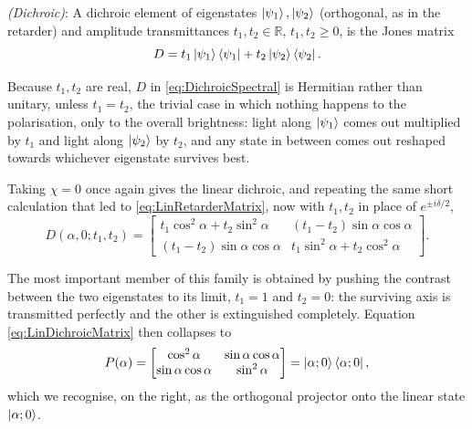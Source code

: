             \begin{myDef}
                \textit{(Dichroic)}: A dichroic element of eigenstates $\ket{\psi_1},\ket{\psi_2}$ (orthogonal, as in the retarder) and amplitude transmittances $t_1,t_2\in\mathbb{R}$, $t_1,t_2\geq0$, is the Jones matrix
                \begin{equation}\label{eq:DichroicSpectral}
                    D = t_1\ket{\psi_1}\bra{\psi_1} + t_2\ket{\psi_2}\bra{\psi_2}.
                \end{equation}
            \end{myDef}

            Because $t_1,t_2$ are real, $D$ in \ref{eq:DichroicSpectral} is Hermitian rather than unitary, unless $t_1=t_2$, the trivial case in which nothing happens to the polarisation, only to the overall brightness: light along $\ket{\psi_1}$ comes out multiplied by $t_1$ and light along $\ket{\psi_2}$ by $t_2$, and any state in between comes out reshaped towards whichever eigenstate survives best.

            Taking $\chi=0$ once again gives the linear dichroic, and repeating the same short calculation that led to \ref{eq:LinRetarderMatrix}, now with $t_1,t_2$ in place of $e^{\pm i\delta/2}$,
            \begin{equation}\label{eq:LinDichroicMatrix}
                D(\alpha,0;t_1,t_2) = \begin{bmatrix}
                    t_1\cos^2\alpha + t_2\sin^2\alpha & (t_1-t_2)\sin\alpha\cos\alpha \\
                    (t_1-t_2)\sin\alpha\cos\alpha & t_1\sin^2\alpha + t_2\cos^2\alpha
                \end{bmatrix}.
            \end{equation}

            The most important member of this family is obtained by pushing the contrast between the two eigenstates to its limit, $t_1=1$ and $t_2=0$: the surviving axis is transmitted perfectly and the other is extinguished completely. Equation \ref{eq:LinDichroicMatrix} then collapses to
            \begin{equation}\label{eq:LinPolariserMatrix}
                P(\alpha) = \begin{bmatrix}\cos^2\alpha & \sin\alpha\cos\alpha\\ \sin\alpha\cos\alpha & \sin^2\alpha\end{bmatrix} = \ket{\alpha;0}\bra{\alpha;0},
            \end{equation}
            which we recognise, on the right, as the orthogonal projector onto the linear state $\ket{\alpha;0}$.

